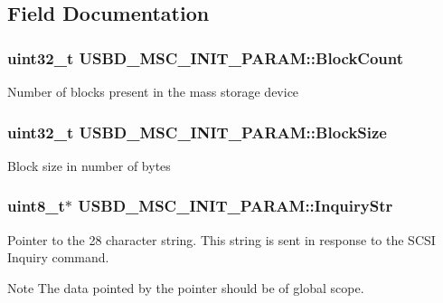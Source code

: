 \subsection{Field Documentation}
\hypertarget{structUSBD__MSC__INIT__PARAM_a88951ad7bc026318e18eadf372804caa}{
\subsubsection[{Block\-Count}]{\setlength{\rightskip}{0pt plus 5cm}uint32\-\_\-t U\-S\-B\-D\-\_\-\-M\-S\-C\-\_\-\-I\-N\-I\-T\-\_\-\-P\-A\-R\-A\-M\-::\-Block\-Count}}\label{structUSBD__MSC__INIT__PARAM_a88951ad7bc026318e18eadf372804caa}
Number of blocks present in the mass storage device \hypertarget{structUSBD__MSC__INIT__PARAM_af0ed8a5b4aec5f19e1b15c1ab3c3dcbd}{
\subsubsection[{Block\-Size}]{\setlength{\rightskip}{0pt plus 5cm}uint32\-\_\-t U\-S\-B\-D\-\_\-\-M\-S\-C\-\_\-\-I\-N\-I\-T\-\_\-\-P\-A\-R\-A\-M\-::\-Block\-Size}}\label{structUSBD__MSC__INIT__PARAM_af0ed8a5b4aec5f19e1b15c1ab3c3dcbd}
Block size in number of bytes \hypertarget{structUSBD__MSC__INIT__PARAM_a84e110f5e1d448f9c35e9e8583429df8}{
\subsubsection[{Inquiry\-Str}]{\setlength{\rightskip}{0pt plus 5cm}uint8\-\_\-t$\ast$ U\-S\-B\-D\-\_\-\-M\-S\-C\-\_\-\-I\-N\-I\-T\-\_\-\-P\-A\-R\-A\-M\-::\-Inquiry\-Str}}\label{structUSBD__MSC__INIT__PARAM_a84e110f5e1d448f9c35e9e8583429df8}
Pointer to the 28 character string. This string is sent in response to the S\-C\-S\-I Inquiry command. \begin{DoxyNote}{Note}
The data pointed by the pointer should be of global scope. 
\end{DoxyNote}
